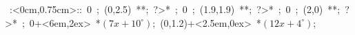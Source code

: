 \hbox{
\xy    <2cm,0cm>:<0cm,0.75cm>::
       0 ; (0,2.5) **\dir{-}; ?>* \dir{>};  
       0 ; (1.9,1.9) **\dir{-}; ?>* \dir{>};  
       0 ; (2,0) **\dir{-}; ?>* \dir{>};  
       0+<6em,2ex> *{\hbox{$(7x+10^{\circ})$}};
       (0,1.2)+<2.5em,0ex> *{\hbox{$(12x+4^{\circ})$}};
       \endxy}
